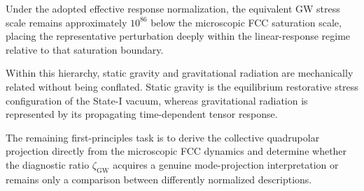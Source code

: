 Under the adopted effective response normalization, the equivalent GW stress scale remains approximately $10^{86}$ below the microscopic FCC saturation scale, placing the representative perturbation deeply within the linear-response regime relative to that saturation boundary.

Within this hierarchy, static gravity and gravitational radiation are mechanically related without being conflated. Static gravity is the equilibrium restorative stress configuration of the State-I vacuum, whereas gravitational radiation is represented by its propagating time-dependent tensor response.

The remaining first-principles task is to derive the collective quadrupolar projection directly from the microscopic FCC dynamics and determine whether the diagnostic ratio $\zeta_{\mathrm{GW}}$ acquires a genuine mode-projection interpretation or remains only a comparison between differently normalized descriptions.
